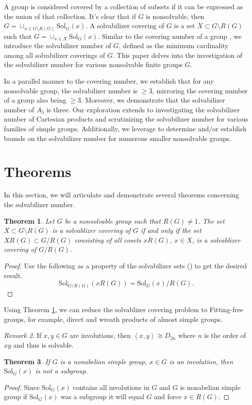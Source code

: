 \documentclass{amsart}
\newcommand{\Solv}{\text{Sol}}
\newcommand{\Sol}{\text{Sol}}
\newtheorem{theorem}{Theorem}[section]
\theoremstyle{definition}
\theoremstyle{remark}
\newtheorem{remark}[theorem]{Remark}
\begin{document}
A group is considered covered by a collection of subsets if it can be expressed as the union of that collection. It's clear that if $G$ is nonsolvable, then $G = \cup_{x\in G\setminus R(G)}\Solv_G(x)$. A solvabilizer covering of $G$ is a set $X\subset G\setminus R(G)$ such that $G = \cup_{x\in X}\Solv_G(x)$. Similar to the covering number of a group \cite{GKS}, we introduce the solvabilizer number of $G$, defined as the minimum cardinality among all solvabilizer coverings of $G$. This paper delves into the investigation of the solvabilizer number for various nonsolvable finite groups $G$.

In a parallel manner to the covering number, we establish that for any nonsolvable group, the solvabilizer number is $\ge 3$, mirroring the covering number of a group also being $\ge 3$. Moreover, we demonstrate that the solvabilizer number of $A_5$ is three. Our exploration extends to investigating the solvabilizer number of Cartesian products and scrutinizing the solvabilizer number for various families of simple groups. Additionally, we leverage \cite{GAP4} to determine and/or establish bounds on the solvabilizer number for numerous smaller nonsolvable groups.
\section{Theorems}
In this section, we will articulate and demonstrate several theorems concerning the solvabilizer number.
\begin{theorem}\label{quotient}
Let $G$ be a nonsolvable group such that $R(G)\neq 1$. The set $X\subset G \setminus R(G)$ is a solvablizer covering of $G$ if and only if the set $XR(G)\subset G/R(G)$ consisting of all cosets $xR(G)$, $x\in X$, is a solvablizer covering of $G/R(G)$.
\end{theorem}
\begin{proof}
Use the following as a property of the solvabilizer sets {\rm (\cite[Lemma 2.5]{ALMM})} to get the desired result.
$$\Sol_{G/R(G)} (xR(G)) = \Sol_G (x)/R(G).$$
\end{proof}
Using Theorem \ref{quotient}, we can reduce the solvablizer covering problem to Fitting-free groups, for example, direct and wreath products of almost simple groups.

\begin{remark}\label{solofinvolution} If $x,y\in G$ are involutions, then  $\left\langle x, y\right\rangle\cong D_{2n}$  where $n$ is the order of $xy$ and thus is solvable.
\end{remark}
\begin{theorem}
If $G$ is a nonabelian simple group,  $x\in G$  is an involution, then $\Solv_G(x)$ is not a subgroup.\end{theorem}
\begin{proof}
Since $\Solv_G(x)$ contains all involutions in $G$ and $G$ is nonabelian simple group if $\Solv_G(x)$ was a subgroup it will equal $G$ and force $x\in R(G)$.
\end{proof}
\end{document}
